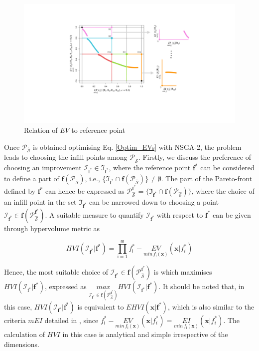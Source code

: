  \begin{figure}
     \centering
    \includegraphics[scale=0.4]{Chapter5/Pictures/EV_rel_EI_ZDT1.pdf}
    \caption{Relation of $EV$ to reference point}
    \label{fig:EV_EIss}
 \end{figure}
 
 
 

Once $\mathscr{P}_{\hat{\mathcal{S}}}$ is obtained optimising Eq. \eqref{Optim_EVs} with NSGA-2, the problem leads to choosing the infill points among  $\mathscr{P}_{\hat{\mathcal{S}}}$. 
Firstly, we discuss the preference of choosing an improvement $\mathscr{I}_{\bm f^*} \in \mathfrak{I}_{\bm f^*}$, where the reference point ${\bm f^*}$ can be considered to define a part of $\bm f(\mathscr{P}_{\hat{\mathcal{S}}})$, i.e., $\{ \mathfrak{I}_{\bm f^*} \cap\bm f(\mathscr{P}_{\hat{\mathcal{S}}})\} \neq \emptyset$.
The part of the Pareto-front defined by ${\bm f^*}$ can hence be expressed as $\mathscr{P}_{\hat{\mathcal{S}}}^{\bm f^*} = \{ \mathfrak{I}_{\bm f^*} \cap \bm f(\mathscr{P}_{\hat{\mathcal{S}}})\}$, where the choice of an infill point in the set  $\mathfrak{I}_{\bm f^*}$ can be narrowed down to choosing a point  $\mathscr{I}_{\bm f^*} \in \bm f(\mathscr{P}_{\hat{\mathcal{S}}}^{\bm f^*})$. A suitable measure to quantify $\mathscr{I}_{\bm f^*}$ with respect to ${\bm f^*}$ can be given through hypervolume metric as

\begin{equation}\label{HVI_ref}
HVI(\mathscr{I}_{\bm f^*}|{\bm f^*})=\prod_{\mathsf{i}=1}^{\mathsf{m}} f_{\mathsf{i}}^*-\underset{min\,f_{\mathsf i}(\bm{x})}{EV}(\bm x|f^*_i)
\end{equation}

Hence, the most suitable choice of $\mathscr{I}_{\bm f^*} \in \bm f ( \mathscr{P}_{\hat{\mathcal{S}}}^{\bm f^*})$ is which maximises  $HVI(\mathscr{I}_{\bm f^*}|{\bm f^*})$, expressed as $\underset{\mathscr{I}_{\bm f^*} \in \bm f(\mathscr{P}_{\hat{\mathcal{S}}}^{\bm f^*})}{max} HVI(\mathscr{I}_{\bm f^*}|{\bm f^*})$.  It should be noted that, in this case, $HVI(\mathscr{I}_{\bm f^*}|{\bm f^*})$ is equivalent to ${EHVI}(\bm{x}|{\bm f^*})$, which is also similar to the criteria $mEI$ detailed in $\label{mEI}$, since $ f_{\mathsf{i}}^*-\underset{min\,f_{\mathsf i}(\bm{x})}{EV}(\bm x|f^*_i)=\underset{min\,f_{\mathsf i}(\bm{x})}{EI}(\bm x|f^*_i)$. The calculation of $HVI$ in this case is analytical and simple irrespective of the dimensions.\\

